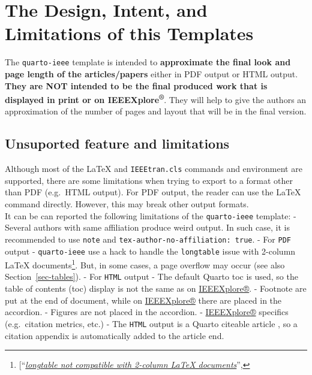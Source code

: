 \documentclass[
  twoside,
  web,
            journal,
    ]{ieeecolor}
\theoremstyle{plain}
\theoremstyle{remark}
\begin{document}
\section{The Design, Intent, and Limitations of this
Templates}\label{the-design-intent-and-limitations-of-this-templates}

The \texttt{quarto-ieee} template is intended to \textbf{approximate the
final look and page length of the articles/papers} either in PDF output
or HTML output. \textbf{They are NOT intended to be the final produced
work that is displayed in print or on IEEEXplore\textsuperscript{®}}.
They will help to give the authors an approximation of the number of
pages and layout that will be in the final version.

\subsection{Unsuported feature and
limitations}\label{unsuported-feature-and-limitations}

Although most of the {\LaTeX} and \texttt{IEEEtran.cls} commands and
environment are supported, there are some limitations when trying to
export to a format other than PDF (e.g.~HTML output). For PDF output,
the reader can use the {\LaTeX} command directly. However, this may
break other output formats.\\
It can be can reported the following limitations of the
\texttt{quarto-ieee} template: - Several authors with same affiliation
produce weird output. In such case, it is recommended to use
\texttt{note} and \texttt{tex-author-no-affiliation:\ true}. - For
\texttt{PDF} output - \texttt{quarto-ieee} use a hack to handle the
\texttt{longtable} issue with 2-column {\LaTeX} documents\footnote{{[}``\emph{\href{https://github.com/jgm/pandoc/issues/1023\%3E}{longtable
  not compatible with 2-column LaTeX documents}}'',}. But, in some
cases, a page overflow may occur (see also Section~\ref{sec-tables}). -
For \texttt{HTML} output - The default Quarto toc is used, so the table
of contents (toc) display is not the same as on
\href{https://ieeexplore.ieee.org/}{IEEEXplore®}. - Footnote are put at
the end of document, while on
\href{https://ieeexplore.ieee.org/}{IEEEXplore®} there are placed in the
accordion. - Figures are not placed in the accordion. -
\href{https://ieeexplore.ieee.org/}{IEEEXplore®} specifics
(e.g.~citation metrics, etc.) - The \texttt{HTML} output is a Quarto
citeable article , so a citation
appendix is automatically added to the article end.
\end{document}
